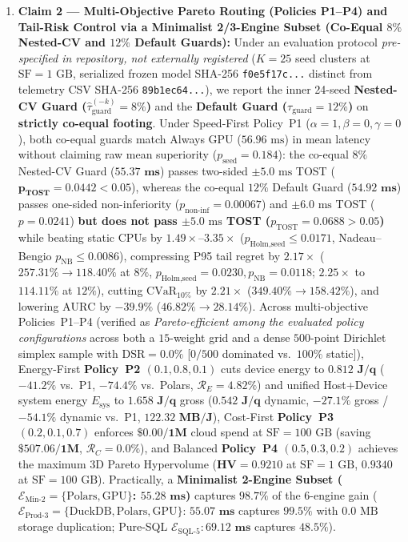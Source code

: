 \documentclass[10pt,a4paper]{article}
\begin{document}
\begin{enumerate}[leftmargin=1.5em,itemsep=3pt]
    \item \textbf{Claim 2 --- Multi-Objective Pareto Routing (Policies P1--P4) and Tail-Risk Control via a Minimalist 2/3-Engine Subset (Co-Equal $8\%$ Nested-CV and $12\%$ Default Guards):} Under an evaluation protocol \emph{pre-specified in repository, not externally registered} ($K=25$ seed clusters at $\text{SF}=1\text{ GB}$, serialized frozen model SHA-256 \texttt{f0e5f17c...} distinct from telemetry CSV SHA-256 \texttt{89b1ec64...}), we report the inner 24-seed \textbf{Nested-CV Guard ($\hat{\tau}_{\text{guard}}^{(-k)}=8\%$)} and the \textbf{Default Guard ($\tau_{\text{guard}}=12\%$)} on \textbf{strictly co-equal footing}. Under Speed-First Policy~P1 ($\alpha=1,\beta=0,\gamma=0$), both co-equal guards match Always GPU ($56.96\text{ ms}$) in mean latency without claiming raw mean superiority ($p_{\text{seed}}=0.184$): the co-equal $8\%$ Nested-CV Guard ($\mathbf{55.37\text{ ms}}$) passes two-sided $\pm 5.0\text{ ms}$ TOST ($\mathbf{p_{\text{TOST}}=0.0442 < 0.05}$), whereas the co-equal $12\%$ Default Guard ($\mathbf{54.92\text{ ms}}$) passes one-sided non-inferiority ($p_{\text{non-inf}}=0.00067$) and $\pm 6.0\text{ ms}$ TOST ($p=0.0241$) \textbf{but does not pass $\pm 5.0\text{ ms}$ TOST ($p_{\text{TOST}}=0.0688 > 0.05$)} while beating static CPUs by $1.49\times\text{--}3.35\times$ ($p_{\text{Holm,seed}}\le 0.0171$, Nadeau--Bengio $p_{\text{NB}}\le 0.0086$), compressing P95 tail regret by $\mathbf{2.17\times}$ ($257.31\% \rightarrow \mathbf{118.40\%}$ at $8\%$, $p_{\text{Holm,seed}}=0.0230, p_{\text{NB}}=0.0118$; $\mathbf{2.25\times}$ to $\mathbf{114.11\%}$ at $12\%$), cutting $\text{CVaR}_{10\%}$ by $\mathbf{2.21\times}$ ($349.40\% \rightarrow \mathbf{158.42\%}$), and lowering $\text{AURC}$ by $\mathbf{-39.9\%}$ ($46.82\% \rightarrow 28.14\%$). Across multi-objective Policies~P1--P4 (verified as \emph{Pareto-efficient among the evaluated policy configurations} across both a $15$-weight grid and a dense $500$-point Dirichlet simplex sample with $\text{DSR}=\mathbf{0.0\%}$ [$0/500$ dominated vs.\ $100\%$ static]), Energy-First \textbf{Policy~P2 $(0.1,0.8,0.1)$} cuts device energy to $\mathbf{0.812\text{ J/q}}$ ($\mathbf{-41.2\%}$ vs.\ P1, $\mathbf{-74.4\%}$ vs.\ Polars, $\mathcal{R}_E=4.82\%$) and unified Host+Device system energy $E_{\text{sys}}$ to $\mathbf{1.658\text{ J/q}}$ gross ($\mathbf{0.542\text{ J/q}}$ dynamic, $\mathbf{-27.1\%}$ gross / $\mathbf{-54.1\%}$ dynamic vs.\ P1, $\mathbf{122.32\text{ MB/J}}$), Cost-First \textbf{Policy~P3 $(0.2,0.1,0.7)$} enforces $\mathbf{\$0.00/1\text{M}}$ cloud spend at $\text{SF}=100\text{ GB}$ (saving $\mathbf{\$507.06/1\text{M}}$, $\mathcal{R}_C=0.0\%$), and Balanced \textbf{Policy~P4 $(0.5,0.3,0.2)$} achieves the maximum 3D Pareto Hypervolume ($\mathbf{\text{HV}=0.9210}$ at $\text{SF}=1\text{ GB}$, $\mathbf{0.9340}$ at $\text{SF}=100\text{ GB}$). Practically, a \textbf{Minimalist 2-Engine Subset ($\mathcal{E}_{\text{Min-2}}=\{\text{Polars},\text{GPU}\}$: $\mathbf{55.28\text{ ms}}$)} captures $\mathbf{98.7\%}$ of the 6-engine gain ($\mathcal{E}_{\text{Prod-3}}=\{\text{DuckDB},\text{Polars},\text{GPU}\}$: $\mathbf{55.07\text{ ms}}$ captures $\mathbf{99.5\%}$ with $0.0\text{ MB}$ storage duplication; Pure-SQL $\mathcal{E}_{\text{SQL-5}}: \mathbf{69.12\text{ ms}}$ captures $48.5\%$).

\end{enumerate}
\end{document}
